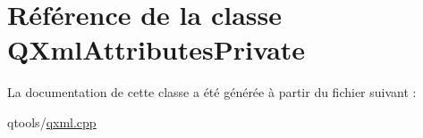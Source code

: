 \hypertarget{class_q_xml_attributes_private}{}\section{Référence de la classe Q\+Xml\+Attributes\+Private}
\label{class_q_xml_attributes_private}


La documentation de cette classe a été générée à partir du fichier suivant \+:\begin{DoxyCompactItemize}
\item 
qtools/\hyperlink{qxml_8cpp}{qxml.\+cpp}\end{DoxyCompactItemize}
